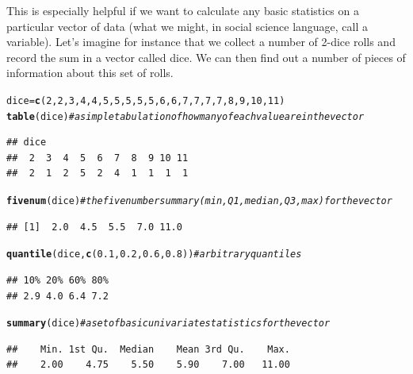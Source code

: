 \documentclass[12pt]{article}\usepackage[]{graphicx}\usepackage[]{color}
\makeatletter
\newcommand{\hlnum}[1]{\textcolor[rgb]{0.686,0.059,0.569}{#1}}%
\newcommand{\hlcom}[1]{\textcolor[rgb]{0.678,0.584,0.686}{\textit{#1}}}%
\newcommand{\hlstd}[1]{\textcolor[rgb]{0.345,0.345,0.345}{#1}}%
\newcommand{\hlkwb}[1]{\textcolor[rgb]{0.69,0.353,0.396}{#1}}%
\newcommand{\hlkwd}[1]{\textcolor[rgb]{0.737,0.353,0.396}{\textbf{#1}}}%
\newenvironment{kframe}{%
 \def\at@end@of@kframe{}%
 \ifinner\ifhmode%
  \def\at@end@of@kframe{\end{minipage}}%
  \begin{minipage}{\columnwidth}%
 \fi\fi%
 \def\FrameCommand##1{\hskip\@totalleftmargin \hskip-\fboxsep
 \colorbox{shadecolor}{##1}\hskip-\fboxsep
     \hskip-\linewidth \hskip-\@totalleftmargin \hskip\columnwidth}%
 \MakeFramed {\advance\hsize-\width
   \@totalleftmargin\z@ \linewidth\hsize
   \@setminipage}}%
 {\par\unskip\endMakeFramed%
 \at@end@of@kframe}
\newenvironment{knitrout}{}{} %
\makeatother
\begin{document}
This is especially helpful if we want to calculate any basic statistics on a particular vector of data (what we might, in social science language, call a variable). Let's imagine for instance that we collect a number of 2-dice rolls and record the sum in a vector called dice. We can then find out a number of pieces of information about this set of rolls.

\begin{knitrout}
\color{fgcolor}\begin{kframe}
\begin{alltt}
\hlstd{dice} \hlkwb{=} \hlkwd{c}\hlstd{(}\hlnum{2}\hlstd{,} \hlnum{2}\hlstd{,} \hlnum{3}\hlstd{,} \hlnum{4}\hlstd{,} \hlnum{4}\hlstd{,} \hlnum{5}\hlstd{,} \hlnum{5}\hlstd{,} \hlnum{5}\hlstd{,} \hlnum{5}\hlstd{,} \hlnum{5}\hlstd{,} \hlnum{6}\hlstd{,} \hlnum{6}\hlstd{,} \hlnum{7}\hlstd{,} \hlnum{7}\hlstd{,} \hlnum{7}\hlstd{,} \hlnum{7}\hlstd{,} \hlnum{8}\hlstd{,} \hlnum{9}\hlstd{,} \hlnum{10}\hlstd{,} \hlnum{11}\hlstd{)}
\hlkwd{table}\hlstd{(dice)}  \hlcom{#a simple tabulation of how many of each value are in the vector}
\end{alltt}
\begin{verbatim}
## dice
##  2  3  4  5  6  7  8  9 10 11 
##  2  1  2  5  2  4  1  1  1  1
\end{verbatim}
\begin{alltt}
\hlkwd{fivenum}\hlstd{(dice)}  \hlcom{#the five number summary (min, Q1, median, Q3, max) for the vector}
\end{alltt}
\begin{verbatim}
## [1]  2.0  4.5  5.5  7.0 11.0
\end{verbatim}
\begin{alltt}
\hlkwd{quantile}\hlstd{(dice,} \hlkwd{c}\hlstd{(}\hlnum{0.1}\hlstd{,} \hlnum{0.2}\hlstd{,} \hlnum{0.6}\hlstd{,} \hlnum{0.8}\hlstd{))}  \hlcom{#arbitrary quantiles}
\end{alltt}
\begin{verbatim}
## 10% 20% 60% 80% 
## 2.9 4.0 6.4 7.2
\end{verbatim}
\begin{alltt}
\hlkwd{summary}\hlstd{(dice)}  \hlcom{#a set of basic univariate statistics for the vector}
\end{alltt}
\begin{verbatim}
##    Min. 1st Qu.  Median    Mean 3rd Qu.    Max. 
##    2.00    4.75    5.50    5.90    7.00   11.00
\end{verbatim}
\end{kframe}
\end{knitrout}
\end{document}

